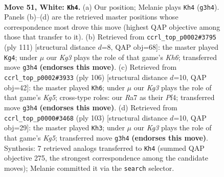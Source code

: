 \documentclass[11pt]{article}
\begin{document}
\clearpage

\begin{figure}[p]\centering
\begin{subfigure}{0.46\textwidth}\centering
\resizebox{\linewidth}{!}{%
\newchessgame
\chessboard[
  setfen={6rk/R7/8/P7/8/6K1/8/8 w - - 5 51},
  showmover=false,
  pgfstyle=straightmove, color=movearrow, markmove={g3-h4}
]}
\caption{}
\end{subfigure}\hfill
\begin{subfigure}{0.46\textwidth}\centering
\resizebox{\linewidth}{!}{%
\newchessgame
\chessboard[
  setfen={7r/P7/8/8/8/1KR4k/7p/8 b - - 4 56},
  showmover=false,
  pgfstyle=straightmove, color=movearrow, markmove={h3-g4}
]}
\caption{}
\end{subfigure}
\\[4pt]
\begin{subfigure}{0.46\textwidth}\centering
\resizebox{\linewidth}{!}{%
\newchessgame
\chessboard[
  setfen={8/8/2R5/p5K1/5P2/8/6r1/6k1 w - - 7 54},
  showmover=false,
  pgfstyle=straightmove, color=movearrow, markmove={g5-h6}
]}
\caption{}
\end{subfigure}\hfill
\begin{subfigure}{0.46\textwidth}\centering
\resizebox{\linewidth}{!}{%
\newchessgame
\chessboard[
  setfen={3r4/8/7p/5p2/6k1/8/6R1/6K1 b - - 1 52},
  showmover=false,
  pgfstyle=straightmove, color=movearrow, markmove={g4-h3}
]}
\caption{}
\end{subfigure}
\caption{\textbf{Move 51, White: \texttt{Kh4}.} (a) Our position; Melanie plays \texttt{Kh4} (\texttt{g3h4}). Panels (b)--(d) are the retrieved master positions whose correspondence most drove this move (highest QAP objective among those that transfer to it). (b) Retrieved from \texttt{ccrl\_top\_p0002\#3795} (ply 111) [structural distance $d$=8, QAP obj=68]: the master played \texttt{Kg4}; under $\mu$ our \emph{Kg3} plays the role of that game's \emph{Kh6}; transferred move \texttt{g3h4} \textbf{(endorses this move)}. (c) Retrieved from \texttt{ccrl\_top\_p0002\#3933} (ply 106) [structural distance $d$=10, QAP obj=42]: the master played \texttt{Kh6}; under $\mu$ our \emph{Kg3} plays the role of that game's \emph{Kg5}; cross-type roles: our \emph{R}a7 as their \emph{P}f4; transferred move \texttt{g3h4} \textbf{(endorses this move)}. (d) Retrieved from \texttt{ccrl\_top\_p0000\#3468} (ply 103) [structural distance $d$=10, QAP obj=29]: the master played \texttt{Kh3}; under $\mu$ our \emph{Kg3} plays the role of that game's \emph{Kg5}; transferred move \texttt{g3h4} \textbf{(endorses this move)}. Synthesis: 7 retrieved analogs transferred to \texttt{Kh4} (summed QAP objective 275, the strongest correspondence among the candidate moves); Melanie committed it via the \texttt{search} selector.}
\label{fig:thought-m100}
\end{figure}
\end{document}
